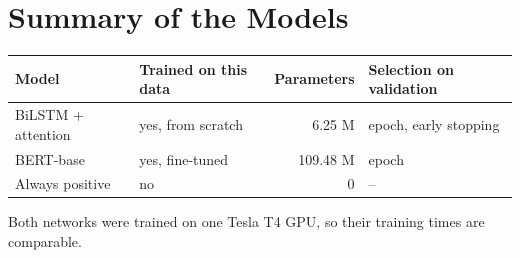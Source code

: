 \section{Summary of the Models}
\label{sec:6-7}

\begin{center}
\small
\begin{tabular}{@{}p{3.6cm}p{3.4cm}rp{3.6cm}@{}}
    \toprule
    Model & Trained on this data & Parameters & Selection on validation \\
    \midrule
    BiLSTM + attention & yes, from scratch & 6.25 M & epoch, early stopping \\
    BERT-base & yes, fine-tuned & 109.48 M & epoch \\
    Always positive & no & 0 & -- \\
    \bottomrule
\end{tabular}
\end{center}

Both networks were trained on one Tesla T4 GPU, so their training times are comparable.

